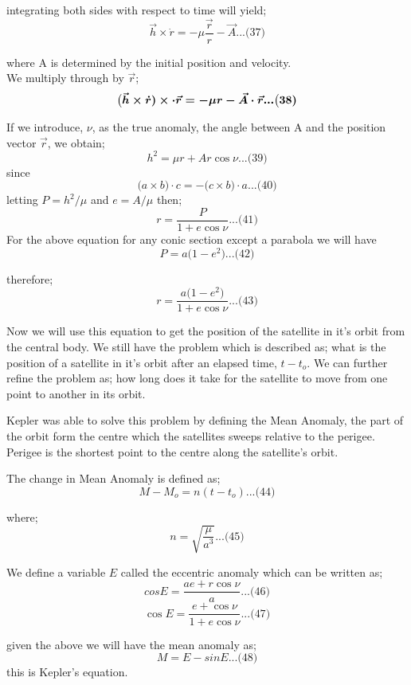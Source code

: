integrating both sides with respect to time will yield;
\[\vec{h}\times\dot{r}= -\mu \frac{\vec{r}}{r}- \vec{A}  ... \big(37)\]

where A is determined by the initial position and velocity.\\

We multiply through by \(\vec{r}\);
\[\big(\vec{h}\times\dot{r})\times\cdot\vec{r}= -\mu \boldmath{r}- \vec{A}\cdot\vec{r}  ... \big(38)\]

If we introduce, \(\nu\), as the true anomaly, the angle between A and the position vector \(\vec{r}\), we obtain;
\[h^2=\mu r + Ar \cos \nu  ... \big(39)\]
since
\[\big(a\times b\big)\cdot c = -\big(c\times b\big)\cdot a  ... \big(40)\]
letting \(P=h^2/\mu \) and \(e = A/\mu \) then;
\[r=\frac{P}{1+e \cos \nu}  ... \big(41)\]
For the above equation for any conic section except a parabola we will have
\[P = a\big(1-e^2)   ... \big(42)\]

therefore;
\[r=\frac{a\big(1-e^2)}{1+e \cos \nu}   ... \big(43)\]

Now we will use this equation to get the position of the satellite in it's orbit from the central body. We still have the problem which is described as; what is the position of a satellite in it's orbit after an elapsed time, \(t-t_o\). We can further refine the problem as; how long does it take for the satellite to move from one point to another in its orbit.

Kepler was able to solve this problem by defining the Mean Anomaly, the part of the orbit form the centre which the satellites sweeps relative to the perigee. Perigee is the shortest point to the centre along the satellite's orbit. 

The change in Mean Anomaly is defined as;
\[M-M_o = n(t-t_o)   ... \big(44)\]

where;
\[n=\sqrt{\frac{\mu}{a^3}}   ... \big(45)\] 

We define a variable \(E\) called the eccentric anomaly which can be written as;
\[cos E = \frac{ae + r \cos \nu}{a}   ... \big(46)\]
\[ \cos E = \frac{e+\cos \nu}{1+e \cos \nu}   ... \big(47)\]

given the above we will have the mean anomaly as;
\[M= E-sinE   ... \big(48)\]
this is Kepler's equation.

